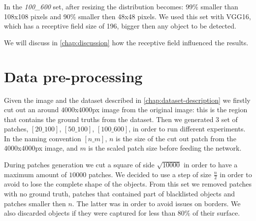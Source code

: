 \documentclass[a4paper,10pt]{report}
\begin{document}
In the \emph{100\_600} set, after resizing the distribution becomes: 99\% smaller than 108x108 pixels and 90\% smaller then 48x48 pixels.
We used this set with VGG16, which has a receptive field size of 196, bigger then any object to be detected.

We will discuss in \ref{chap:discussion} how the receptive field influenced the results.
\begin{table}[t]
    \center
    \caption{Hyperparameters}
    \label{table:hyperparameters}
  \end{table}
 
\section{Data pre-processing}\label{sec:data-handling}
Given the image and the dataset described in \ref{chap:dataset-description} we firstly cut out an around $4000$x$4000$px image from the original image: this is the region that contains the ground truths from the dataset.
Then we generated 3 set of patches, $[20\_100]$, $[50\_100]$, $[100\_600]$, in order to run different experiments. In the naming convention $[n\_m]$, $n$ is the size of the cut out patch from the $4000$x$4000$px image, and $m$ is the scaled patch size before feeding the network.

During patches generation we cut a square of side $\sqrt{10000}$ in order to have a maximum amount of $10000$ patches. We decided to use a step of size $\frac{n}{2}$ in order to avoid to lose the complete shape of the objects.
From this set we removed patches with no ground truth, patches that contained part of blacklisted objects and patches smaller then $n$. The latter was in order to avoid issues on borders.
We also discarded objects if they were captured for less than $80\%$ of their surface.
\end{document}
